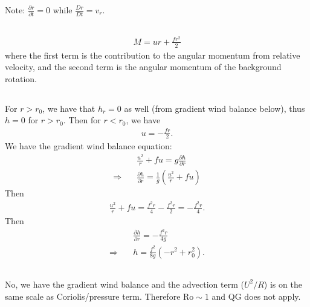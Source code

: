 \documentclass[11pt,letterpaper]{book}
\theoremstyle{definition}
\newcommand{\pe}{\partial}
\newcommand{\dsp}{\displaystyle}
\newcommand{\thus}{\Rightarrow \quad }
\begin{document}
Note: $\dsp{\frac{\pe r}{\pe t} = 0}$ while $\dsp{\frac{Dr}{Dt} = v_r}$.

\subsection{}
\begin{align*}
    M = ur+\frac{fr^2}{2}
\end{align*}
where the first term is the contribution to the angular momentum from relative velocity, and the second term is the angular momentum of the background rotation.

\subsection{}
For $r>r_0$, we have that $h_r = 0$ as well (from gradient wind balance below), thus $h=0$ for $r>r_0$. Then for $r<r_0$, we have
\begin{align*}
    u = -\frac{fr}{2}.
\end{align*}
We have the gradient wind balance equation:
\begin{align*}
    &\frac{u^2}{r}+fu = g\frac{\pe h}{\pe r}\\
    \thus &\frac{\pe h}{\pe r} = \frac{1}{g}\left(\frac{u^2}{r}+fu\right)
\end{align*}
Then
\begin{align*}
    \frac{u^2}{r}+fu = \frac{f^2r}{4}-\frac{f^2r}{2} = -\frac{f^2r}{4}.
\end{align*}
Then
\begin{align*}
    &\frac{\pe h}{\pe r} = -\frac{f^2r}{4g}\\
    \thus & h = \frac{f^2}{8g}(-r^2+r_0^2).
\end{align*}


\subsection{}
No, we have the gradient wind balance and the advection term ($U^2/R$) is on the same scale as Coriolis/pressure term. Therefore $\text{Ro}\sim 1$ and QG does not apply.
\end{document}
